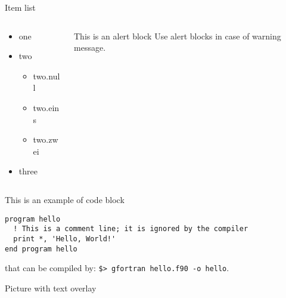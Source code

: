 \documentclass[aspectratio=169,11pt]{beamer}
\newcommand{\cmark}{\ding{51}}%
\newcommand{\xmark}{\ding{55}}
\newcommand{\pro}[1]{\item[{\color{nwclgreen}\cmark}] #1}
\newcommand{\con}[1]{\item[{\color{darkred}\xmark}] #1}
\begin{document}
\begin{frame}[fragile]{Item list}
\begin{columns}
\begin{column}{0.35\textwidth}
\begin{itemize}
  \pro one
  \con two
  \begin{itemize}[<alert@+>]
    \item two.null
    \item two.eins
    \item two.zwei
  \end{itemize}
  \item three
\end{itemize}
\end{column}
\begin{column}{0.64\textwidth}
\begin{alertblock}{This is an alert block}
Use alert blocks in case of warning message.
\end{alertblock}
\end{column}
\end{columns}
%
\begin{exampleblock}{This is an example of code block}\scriptsize
{}
\begin{lstlisting}
program hello
  ! This is a comment line; it is ignored by the compiler
  print *, 'Hello, World!'
end program hello
\end{lstlisting}
that can be compiled by: \lstinline|$> gfortran hello.f90 -o hello|.
\end{exampleblock}
\end{frame}

\begin{frame}{Picture with text overlay}
\end{frame}
\end{document}
